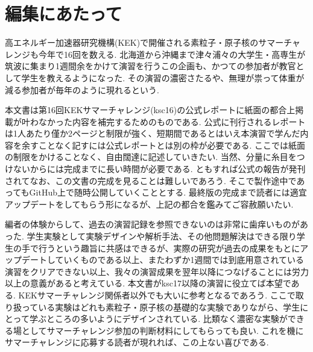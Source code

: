 \section*{編集にあたって}

高エネルギー加速器研究機構(KEK)で開催される素粒子・原子核のサマーチャレンジも今年で16回を数える.
北海道から沖縄まで津々浦々の大学生・高専生が筑波に集まり1週間余をかけて演習を行うこの企画も、かつての参加者が教官として学生を教えるようになった.
その演習の濃密さたるや、無理が祟って体重が減る参加者が毎年のように現れるという.

本文書は第16回KEKサマーチャレンジ(ksc16)の公式レポートに紙面の都合上掲載が叶わなかった内容を補完するためのものである.
公式に刊行されるレポートは1人あたり僅か2ページと制限が強く、短期間であるとはいえ本演習で学んだ内容を余すことなく記すには公式レポートとは別の枠が必要である.
ここでは紙面の制限をかけることなく、自由闊達に記述していきたい.
当然、分量に糸目をつけないからには完成までに長い時間が必要である.
ともすれば公式の報告が発刊されてなお、この文書の完成を見ることは難しいであろう.
そこで製作途中であってもGitHub上で随時公開していくこととする.
最終版の完成まで読者には適宜アップデートをしてもらう形になるが、上記の都合を鑑みてご容赦願いたい.

編者の体験からして、過去の演習記録を参照できないのは非常に歯痒いものがあった.
学生実験として実験デザインや解析手法、その他問題解決はできる限り学生の手で行うという趣旨に共感はできるが、実際の研究が過去の成果をもとにアップデートしていくものである以上、またわずか1週間では到底用意されている演習をクリアできない以上、我々の演習成果を翌年以降につなげることには労力以上の意義があると考えている.
本文書がksc17以降の演習に役立てば本望である.
KEKサマーチャレンジ関係者以外でも大いに参考となるであろう.
ここで取り扱っている実験はどれも素粒子・原子核の基礎的な実験でありながら、学生にとって学ぶところの多いようにデザインされている.
比類なく濃密な実験ができる場としてサマーチャレンジ参加の判断材料にしてもらっても良い.
これを機にサマーチャレンジに応募する読者が現れれば、この上ない喜びである.


\rightline{\today}

